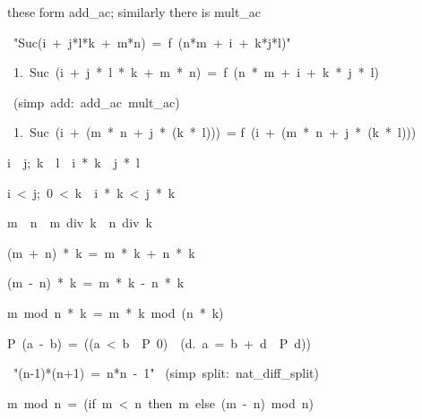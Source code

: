 \begin{isabelle}
\begin{isamarkuptext}
these form add_ac; similarly there is mult_ac%
\end{isamarkuptext}
\ "Suc(i\ +\ j*l*k\ +\ m*n)\ =\ f\ (n*m\ +\ i\ +\ k*j*l)"
\begin{isamarkuptxt}
\begin{isabelle}
\ 1.\ Suc\ (i\ +\ j\ *\ l\ *\ k\ +\ m\ *\ n)\ =\ f\ (n\ *\ m\ +\ i\ +\ k\ *\ j\ *\ l)
\end{isabelle}
\end{isamarkuptxt}
\ (simp\ add:\ add_ac\ mult_ac)
\begin{isamarkuptxt}
\begin{isabelle}
\ 1.\ Suc\ (i\ +\ (m\ *\ n\ +\ j\ *\ (k\ *\ l)))\ =\isanewline
{}f\ (i\ +\ (m\ *\ n\ +\ j\ *\ (k\ *\ l)))
\end{isabelle}
\end{isamarkuptxt}
\begin{isamarkuptext}
\begin{isabelle}
\isasymlbrakk i\ \isasymle \ j;\ k\ \isasymle \ l\isasymrbrakk \ \isasymLongrightarrow \ i\ *\ k\ \isasymle \ j\ *\ l%
\end{isabelle}

\begin{isabelle}
\isasymlbrakk i\ <\ j;\ 0\ <\ k\isasymrbrakk \ \isasymLongrightarrow \ i\ *\ k\ <\ j\ *\ k%
\end{isabelle}

\begin{isabelle}
m\ \isasymle \ n\ \isasymLongrightarrow \ m\ div\ k\ \isasymle \ n\ div\ k%
\end{isabelle}

\begin{isabelle}
(m\ +\ n)\ *\ k\ =\ m\ *\ k\ +\ n\ *\ k%
\end{isabelle}

\begin{isabelle}
(m\ -\ n)\ *\ k\ =\ m\ *\ k\ -\ n\ *\ k%
\end{isabelle}

\begin{isabelle}
m\ mod\ n\ *\ k\ =\ m\ *\ k\ mod\ (n\ *\ k)
\end{isabelle}

\begin{isabelle}
P\ (a\ -\ b)\ =\ ((a\ <\ b\ \isasymlongrightarrow \ P\ 0)\ \isasymand \ (\isasymforall d.\ a\ =\ b\ +\ d\ \isasymlongrightarrow \ P\ d))
\end{isabelle}
\end{isamarkuptext}
\ "(n-1)*(n+1)\ =\ n*n\ -\ 1"\isanewline
{}\ (simp\ split:\ nat_diff_split)\isanewline
{}
\begin{isamarkuptext}
\begin{isabelle}
m\ mod\ n\ =\ (if\ m\ <\ n\ then\ m\ else\ (m\ -\ n)\ mod\ n)
\end{isabelle}


\end{isamarkuptext}
\end{isabelle}
